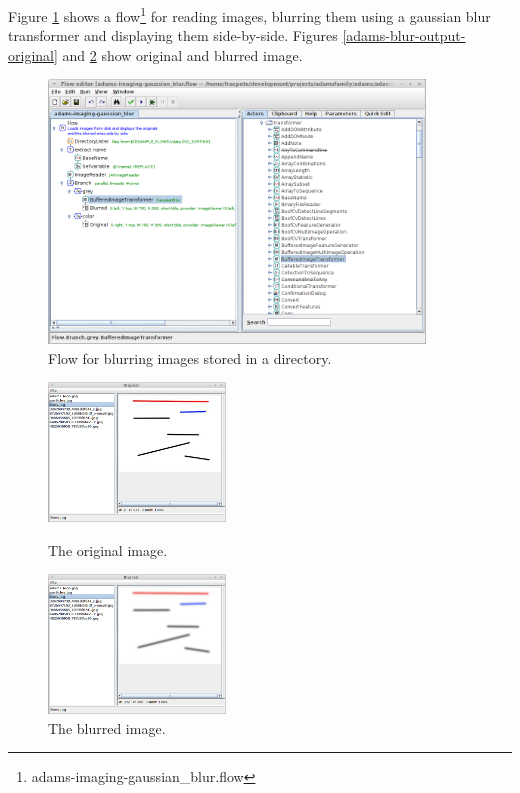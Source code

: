 \documentclass[a4paper]{book}
\begin{document}
Figure \ref{adams-blur-flow} shows a
flow\footnote{adams-imaging-gaussian\_blur.flow} for reading images, blurring
them using a gaussian blur transformer and displaying them side-by-side. Figures
\ref{adams-blur-output-original} and \ref{adams-blur-output-blurred} show original
and blurred image.

\begin{figure}[htb]
  \centering
  \includegraphics[width=10.0cm]{images/adams-blur-flow.png}
  \caption{Flow for blurring images stored in a directory.}
  \label{adams-blur-flow}
\end{figure}

\begin{figure}[htb]
  \begin{minipage}[b]{0.48\linewidth}
  \centering
  \includegraphics[height=3.7cm]{images/adams-blur-output-original.png}
  \caption{The original image.}
  \label{adams-blur-output-original}
  \end{minipage}%
  \begin{minipage}[b]{0.48\linewidth}
  \centering
  \includegraphics[height=3.7cm]{images/adams-blur-output-blurred.png}
  \caption{The blurred image.}
  \label{adams-blur-output-blurred}
  \end{minipage}
\end{figure}
\end{document}
